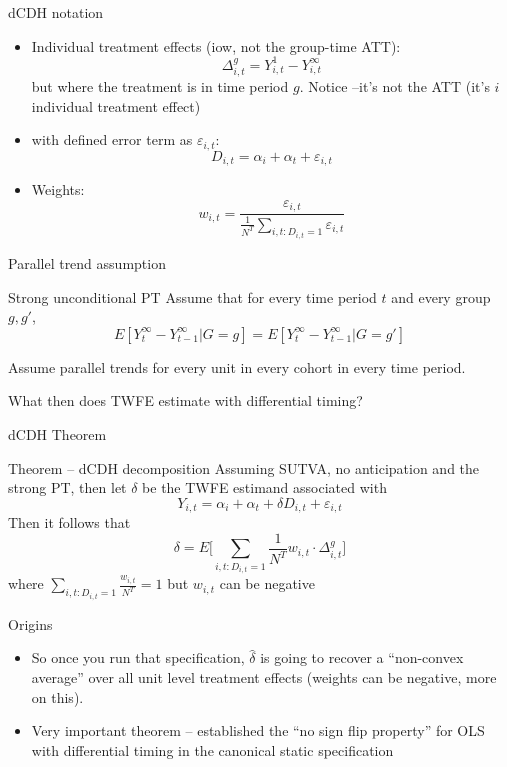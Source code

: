 \documentclass{beamer}
\begin{document}
\begin{frame}{dCDH notation}

\begin{itemize}
\item Individual treatment effects (iow, not the group-time ATT): $$\Delta^g_{i,t} = Y^1_{i,t} - Y^\infty_{i,t}$$ but where the treatment is in time period $g$. Notice --it's not the ATT (it's $i$ individual treatment effect)
\item with defined error term as $\varepsilon_{i,t}$: $$D_{i,t} = \alpha_i + \alpha_t + \varepsilon_{i,t}$$
\item Weights: $$w_{i,t} = \frac{\varepsilon_{i,t}}{\frac{1}{N^T} \sum_{i,t:D_{i,t}=1} \varepsilon_{i,t}}$$
\end{itemize}

\end{frame}

\begin{frame}{Parallel trend assumption}

\begin{block}{Strong unconditional PT}
Assume that for every time period $t$ and every group $g,g'$, $$E[Y^\infty_t - Y^\infty_{t-1}|G=g] = E[Y^\infty_t - Y^\infty_{t-1}|G=g'] $$
\end{block}Assume parallel trends for every unit in every cohort in every time period.

\bigskip

What then does TWFE estimate with differential timing?

\end{frame}

\begin{frame}{dCDH Theorem}

\begin{block}{Theorem -- dCDH decomposition}
Assuming SUTVA, no anticipation and the strong PT, then let $\delta$ be the TWFE estimand associated with $$Y_{i,t} = \alpha_i + \alpha_t + \delta D_{i,t} + \varepsilon_{i,t}$$Then it follows that $$\delta = E \bigg [ \sum_{i,t:D_{i,t}=1} \frac{1}{N^T} w_{i,t} \cdot \Delta_{i,t}^g \bigg ] $$ where $\sum_{i,t:D_{i,t}=1} \frac{w_{i,t}}{N^T} = 1$ but $w_{i,t}$ can be negative
\end{block}

\end{frame}

\begin{frame}{Origins}

\begin{itemize}
\item So once you run that specification, $\widehat{\delta}$ is going to recover a ``non-convex average'' over all unit level treatment effects (weights can be negative, more on this). 
\item Very important theorem -- established the ``no sign flip property'' for OLS with differential timing in the canonical static specification
\end{itemize}

\end{frame}
\end{document}
